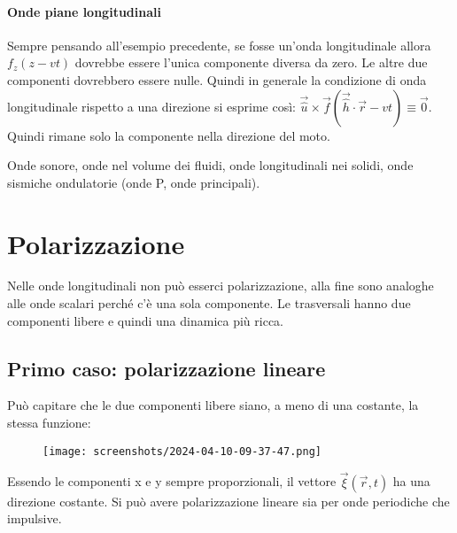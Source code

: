\paragraph{Onde piane longitudinali}
Sempre pensando all'esempio precedente, se fosse un'onda longitudinale allora \(f_z(z-vt)\) dovrebbe essere l'unica componente diversa da zero. Le altre due componenti dovrebbero essere nulle. Quindi in generale la condizione di onda longitudinale rispetto a una direzione si esprime così: \(\vec{\hat{u}} \times \vec{f}(\vec{\hat{h}} \cdot \vec{r} - vt)\equiv \vec{0} \). Quindi rimane solo la componente nella direzione del moto.
\begin{eg}
	Onde sonore, onde nel volume dei fluidi, onde longitudinali nei solidi, onde sismiche ondulatorie (onde P, onde principali).
\end{eg}

\section{Polarizzazione}
Nelle onde longitudinali non può esserci polarizzazione, alla fine sono analoghe alle onde scalari perché c'è una sola componente. Le trasversali hanno due componenti libere e quindi una dinamica più ricca.

\subsection{Primo caso: polarizzazione lineare}
Può capitare che le due componenti libere siano, a meno di una costante, la stessa funzione:
\begin{figure}[H]
	\centering
	\texttt{[image: screenshots/2024-04-10-09-37-47.png]}
\end{figure}
Essendo le componenti x e y sempre proporzionali, il vettore \(\vec{\xi}(\vec{r},t)\) ha una direzione costante. Si può avere polarizzazione lineare sia per onde periodiche che impulsive.

